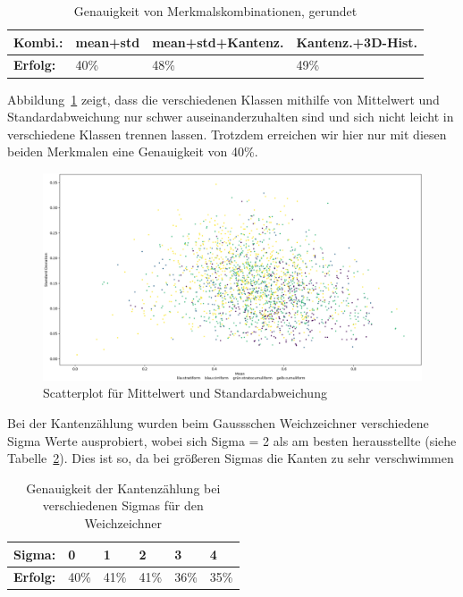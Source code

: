 \documentclass[a4,german]{article}
\begin{document}
\begin{table}[h]
\centering
\begin{tabular}{|l|l|l|l|}
 \hline
 \textbf{Kombi.:}&mean+std&mean+std+Kantenz.&Kantenz.+3D-Hist.\\
 \hline
 \textbf{Erfolg:} & 40\% & 48\% & 49\% \\
 \hline
\end{tabular}
\caption{Genauigkeit von Merkmalskombinationen, gerundet}
\label{tab:gen2}
\end{table}

Abbildung~\ref{fig:meanstd} zeigt, dass die verschiedenen Klassen mithilfe von Mittelwert und Standardabweichung nur schwer auseinanderzuhalten sind und sich nicht leicht in verschiedene Klassen trennen lassen. Trotzdem erreichen wir hier nur mit diesen beiden Merkmalen eine Genauigkeit von 40\%.
\begin{figure}[h!]
\hspace*{-3cm}
\includegraphics[width=1.5\textwidth]{Scatterplot_mean_std.png}
\caption{Scatterplot für Mittelwert und Standardabweichung}
\label{fig:meanstd}
\end{figure}

Bei der Kantenzählung wurden beim Gaussschen Weichzeichner verschiedene Sigma Werte ausprobiert, wobei sich Sigma = 2 als am besten herausstellte (siehe Tabelle~\ref{tab:sigma}).
Dies ist so, da bei größeren Sigmas die Kanten zu sehr verschwimmen %
\begin{table}[h]
\centering
\begin{tabular}{|l|l|l|l|l|l|}
 \hline
 \textbf{Sigma:} & 0 & 1 & 2 & 3 & 4\\
 \hline
 \textbf{Erfolg:} & 40\% & 41\% & 41\% & 36\% & 35\% \\
 \hline
\end{tabular}
\caption{Genauigkeit der Kantenzählung bei verschiedenen Sigmas für den Weichzeichner}
\label{tab:sigma}
\end{table}
\end{document}
